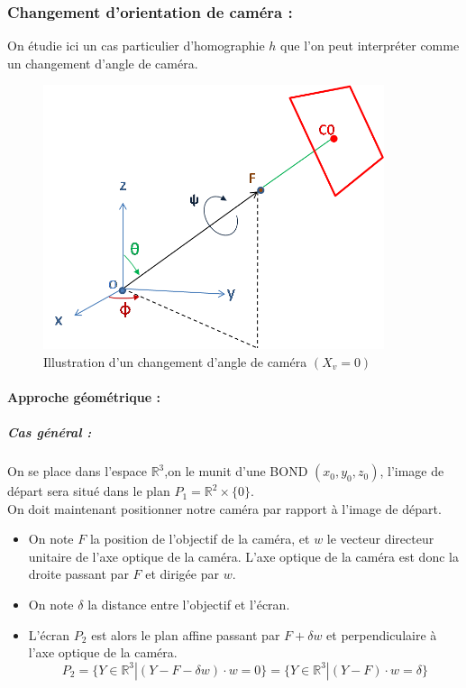 





\subsubsection{Changement d'orientation de caméra :}
On étudie ici un cas particulier d'homographie $h$   que l'on peut interpréter comme un changement d'angle de caméra.\\
\begin{figure}[h!]
\centering
\includegraphics[width=10cm]{shema_decomp.png}
\caption{Illustration d'un changement d'angle de caméra $(X_v =0)$}
\end{figure}

\paragraph{Approche géométrique :}
\subparagraph{Cas général :}


On se place dans l'espace $\mathbb{R}^{3}$,on le munit d'une BOND $(x_{0},y_{0},z_{0})$, l'image de départ sera situé dans le plan $P_{1}= \mathbb{R}^{2}\times \{0\}$.\\
On doit maintenant positionner notre caméra par rapport à l'image de départ.\\
\begin{itemize}
\item On note $F$ la position de l'objectif de la caméra, et $w$ le vecteur directeur unitaire de l'axe optique de la caméra. L'axe optique de la caméra est donc la droite passant par $F$ et dirigée par $w$.\\
\item On note $\delta$ la distance entre l'objectif et l'écran.\\
\item L'écran $P_{2}$ est alors le plan affine passant par $F+\delta w$ et perpendiculaire à l'axe optique de la caméra.
\begin{equation*}
P_{2}=\{Y\in \mathbb{R}^{3}|(Y-F-\delta w)\cdot w=0\}=\{Y\in \mathbb{R}^{3}|(Y-F)\cdot w=\delta\}
\end{equation*}
\end{itemize}

